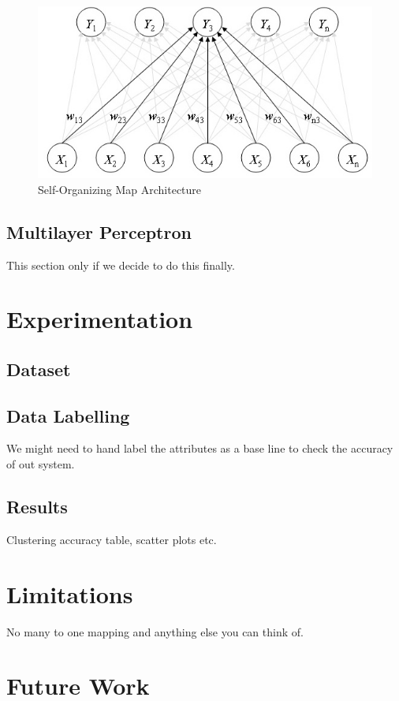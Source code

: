 \documentclass[conference]{IEEEtran}
\begin{document}
\begin{figure}[h]
\centering
\includegraphics[scale=0.4]{1.jpeg}
\caption{Self-Organizing Map Architecture}
\label{SOM}
\end{figure}
\subsection{Multilayer Perceptron}
This section only if we decide to do this finally.

\section{Experimentation}

\subsection{Dataset}
\subsection{Data Labelling}
We might need to hand label the attributes as a base line to check the accuracy of out system.
\subsection{Results}
Clustering accuracy table, scatter plots etc.

\section{Limitations}
No many to one mapping and anything else you can think of.

\section{Future Work}
\end{document}

